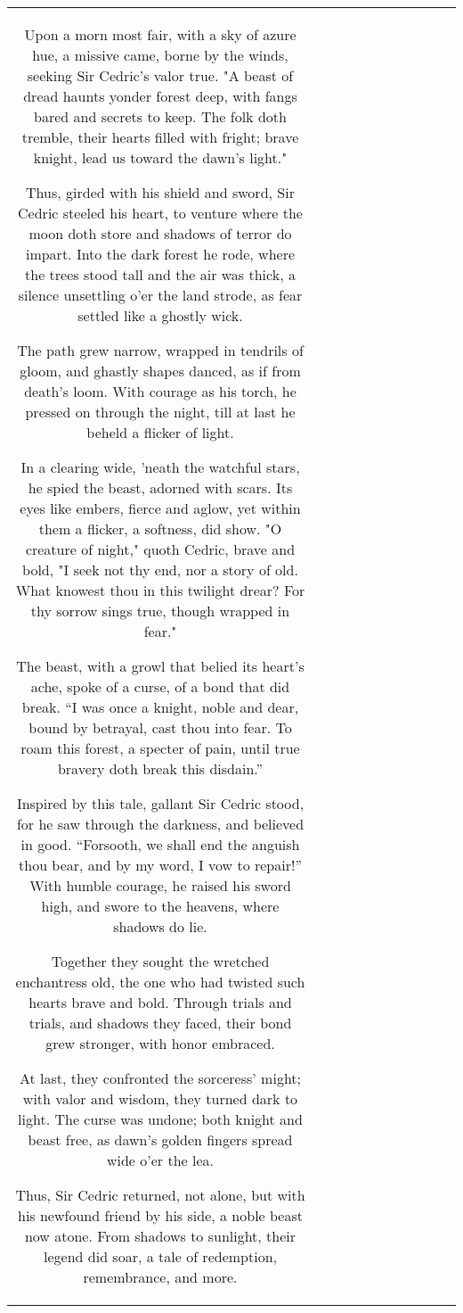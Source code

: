 \begin{table}[h!]
\begin{tabular}{|c|c|c|c|c|c|c|c|c|c|c|}
Upon a morn most fair, with a sky of azure hue, a missive came, borne by the winds, seeking Sir Cedric’s valor true. "A beast of dread haunts yonder forest deep, with fangs bared and secrets to keep. The folk doth tremble, their hearts filled with fright; brave knight, lead us toward the dawn’s light."

Thus, girded with his shield and sword, Sir Cedric steeled his heart, to venture where the moon doth store and shadows of terror do impart. Into the dark forest he rode, where the trees stood tall and the air was thick, a silence unsettling o’er the land strode, as fear settled like a ghostly wick.

The path grew narrow, wrapped in tendrils of gloom, and ghastly shapes danced, as if from death's loom. With courage as his torch, he pressed on through the night, till at last he beheld a flicker of light.

In a clearing wide, 'neath the watchful stars, he spied the beast, adorned with scars. Its eyes like embers, fierce and aglow, yet within them a flicker, a softness, did show. "O creature of night," quoth Cedric, brave and bold, "I seek not thy end, nor a story of old. What knowest thou in this twilight drear? For thy sorrow sings true, though wrapped in fear."

The beast, with a growl that belied its heart's ache, spoke of a curse, of a bond that did break. “I was once a knight, noble and dear, bound by betrayal, cast thou into fear. To roam this forest, a specter of pain, until true bravery doth break this disdain.”

Inspired by this tale, gallant Sir Cedric stood, for he saw through the darkness, and believed in good. “Forsooth, we shall end the anguish thou bear, and by my word, I vow to repair!” With humble courage, he raised his sword high, and swore to the heavens, where shadows do lie.

Together they sought the wretched enchantress old, the one who had twisted such hearts brave and bold. Through trials and trials, and shadows they faced, their bond grew stronger, with honor embraced.

At last, they confronted the sorceress’ might; with valor and wisdom, they turned dark to light. The curse was undone; both knight and beast free, as dawn's golden fingers spread wide o'er the lea.

Thus, Sir Cedric returned, not alone, but with his newfound friend by his side, a noble beast now atone. From shadows to sunlight, their legend did soar, a tale of redemption, remembrance, and more.


\end{tabular}
\end{table}
